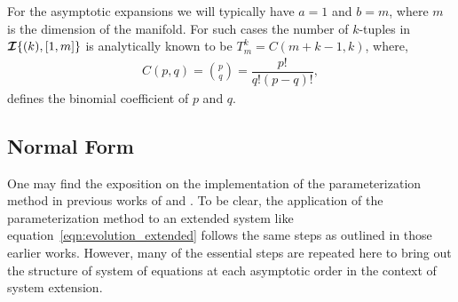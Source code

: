 For the asymptotic expansions we will typically have $a=1$ and $b=m$, where $m$ is the dimension of the manifold. For such cases the number of $k$-tuples in $\bm{\mathcal{I}}\{(k),[1,m]\}$ is analytically known to be $T^{k}_{m} = C(m+k-1,k)$, where, 
\begin{align}
	\label{eqn:binomial}
	C(p,q) = \binom{p}{q} = \dfrac{p!}{q! (p-q)!},
\end{align}
defines the binomial coefficient of $p$ and $q$. 


\subsection{Normal Form}
\label{sec:normal_form}

One may find the exposition on the implementation of the parameterization method in previous works of \citet{haro16} and \citet{jain22}. To be clear, the application of the parameterization method to an extended system like equation~\eqref{eqn:evolution_extended} follows the same steps as outlined in those earlier works. However, many of the essential steps are repeated here to bring out the structure of system of equations at each asymptotic order in the context of system extension.

